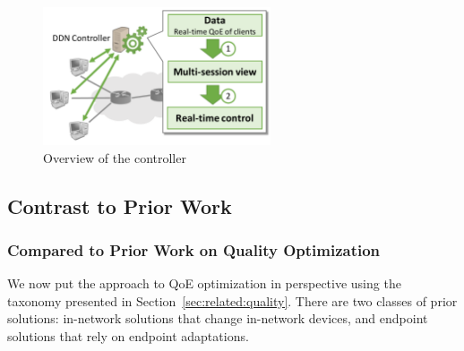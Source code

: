 \begin{figure}[t!]
\centering
\includegraphics[width=0.6\textwidth]{figures/overview-ddn-arch.pdf}
\caption{Overview of the \ddn controller}
\label{fig:intro-contribution}
\end{figure}

\subsection{Contrast to Prior Work}
\label{subsec:overview:contrast}

\subsubsection{Compared to Prior Work on Quality Optimization}

We now put the \ddn approach to QoE optimization in perspective
using the taxonomy presented in Section~\ref{sec:related:quality}.
There are two classes of prior solutions: in-network solutions that change 
in-network devices, and endpoint solutions that rely on endpoint adaptations.


